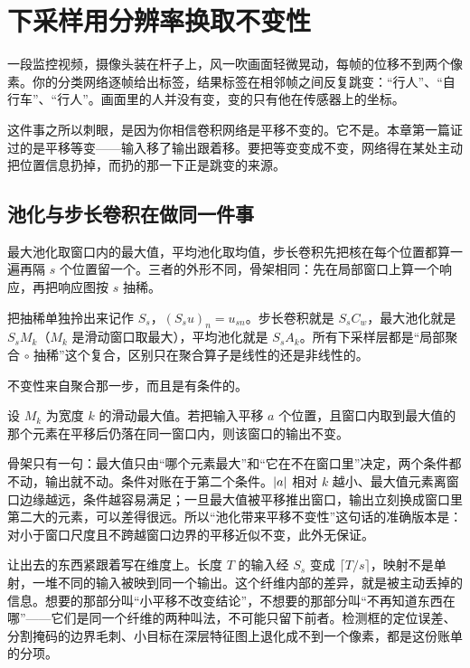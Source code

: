 \section{下采样用分辨率换取不变性}
\label{sec:14-Deep-Learning/04-Convolutional-Networks/03}

一段监控视频，摄像头装在杆子上，风一吹画面轻微晃动，每帧的位移不到两个像素。你的分类网络逐帧给出标签，结果标签在相邻帧之间反复跳变：``行人''、``自行车''、``行人''。画面里的人并没有变，变的只有他在传感器上的坐标。

这件事之所以刺眼，是因为你相信卷积网络是平移不变的。它不是。本章第一篇证过的是平移等变——输入移了输出跟着移。要把等变变成不变，网络得在某处主动把位置信息扔掉，而扔的那一下正是跳变的来源。

\subsection{池化与步长卷积在做同一件事}

最大池化取窗口内的最大值，平均池化取均值，步长卷积先把核在每个位置都算一遍再隔 \(s\) 个位置留一个。三者的外形不同，骨架相同：先在局部窗口上算一个响应，再把响应图按 \(s\) 抽稀。

把抽稀单独拎出来记作 \(S_s\)，\((S_s u)_n = u_{sn}\)。步长卷积就是 \(S_s C_w\)，最大池化就是 \(S_s M_k\)（\(M_k\) 是滑动窗口取最大），平均池化就是 \(S_s A_k\)。所有下采样层都是``局部聚合 \(\circ\) 抽稀''这个复合，区别只在聚合算子是线性的还是非线性的。

不变性来自聚合那一步，而且是有条件的。

\begin{proposition}
设 \(M_k\) 为宽度 \(k\) 的滑动最大值。若把输入平移 \(a\) 个位置，且窗口内取到最大值的那个元素在平移后仍落在同一窗口内，则该窗口的输出不变。
\end{proposition}

骨架只有一句：最大值只由``哪个元素最大''和``它在不在窗口里''决定，两个条件都不动，输出就不动。条件对账在于第二个条件。\(\left|a\right|\) 相对 \(k\) 越小、最大值元素离窗口边缘越远，条件越容易满足；一旦最大值被平移推出窗口，输出立刻换成窗口里第二大的元素，可以差得很远。所以``池化带来平移不变性''这句话的准确版本是：对小于窗口尺度且不跨越窗口边界的平移近似不变，此外无保证。

让出去的东西紧跟着写在维度上。长度 \(T\) 的输入经 \(S_s\) 变成 \(\lceil T/s\rceil\)，映射不是单射，一堆不同的输入被映到同一个输出。这个纤维内部的差异，就是被主动丢掉的信息。想要的那部分叫``小平移不改变结论''，不想要的那部分叫``不再知道东西在哪''——它们是同一个纤维的两种叫法，不可能只留下前者。检测框的定位误差、分割掩码的边界毛刺、小目标在深层特征图上退化成不到一个像素，都是这份账单的分项。

